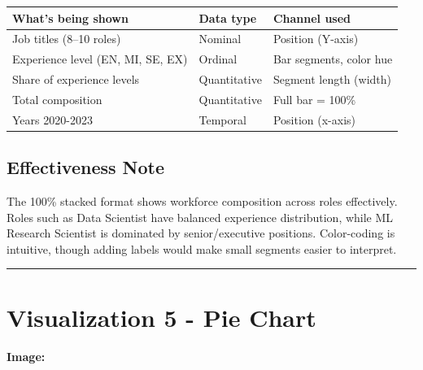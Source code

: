\documentclass[
  letterpaper,
  DIV=11,
  numbers=noendperiod]{scrartcl}
\begin{document}
\begin{longtable}[]{@{}
  >{\raggedright\arraybackslash}p{}
  >{\raggedright\arraybackslash}p{}
  >{\raggedright\arraybackslash}p{}@{}}
\toprule\noalign{}
\begin{minipage}[b]{\linewidth}\raggedright
What's being shown
\end{minipage} & \begin{minipage}[b]{\linewidth}\raggedright
Data type
\end{minipage} & \begin{minipage}[b]{\linewidth}\raggedright
Channel used
\end{minipage} \\
\midrule\noalign{}
\endhead
\bottomrule\noalign{}
\endlastfoot
Job titles (8--10 roles) & Nominal & Position (Y-axis) \\
Experience level (EN, MI, SE, EX) & Ordinal & Bar segments, color hue \\
Share of experience levels & Quantitative & Segment length (width) \\
Total composition & Quantitative & Full bar = 100\% \\
Years 2020-2023 & Temporal & Position (x-axis) \\
\end{longtable}

\subsection{Effectiveness Note}\label{effectiveness-note-3}

The 100\% stacked format shows workforce composition across roles
effectively. Roles such as Data Scientist have balanced experience
distribution, while ML Research Scientist is dominated by
senior/executive positions. Color-coding is intuitive, though adding
labels would make small segments easier to interpret.

\begin{center}\rule{0.5\linewidth}{0.5pt}\end{center}

\section{Visualization 5 - Pie Chart}\label{visualization-5---pie-chart}

\textbf{Image:}
\end{document}
